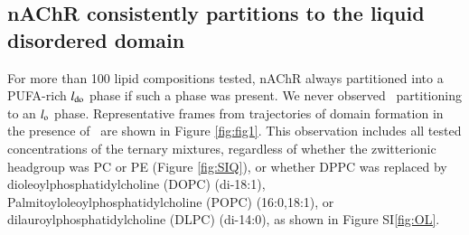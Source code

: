 \subsection{nAChR consistently partitions to the liquid disordered domain} \label{PUFA}
	For more than 100 lipid compositions tested, nAChR always partitioned into a PUFA-rich $l_{\mathrm{do}}$ phase if such a phase was present. We never observed \nachr~partitioning to an $l_{\mathrm{o}}$ phase. Representative frames from trajectories of domain formation in the presence of \nachr~are shown in Figure \ref{fig:fig1}.  This observation includes all tested concentrations of the ternary mixtures, regardless of whether the zwitterionic headgroup was PC or PE (Figure \ref{fig:SIQ}), or whether DPPC was replaced by dioleoylphosphatidylcholine (DOPC) (di-18:1), Palmitoyloleoylphosphatidylcholine (POPC) (16:0,18:1), or dilauroylphosphatidylcholine (DLPC) (di-14:0), as shown in Figure SI\ref{fig:OL}.   %
	
